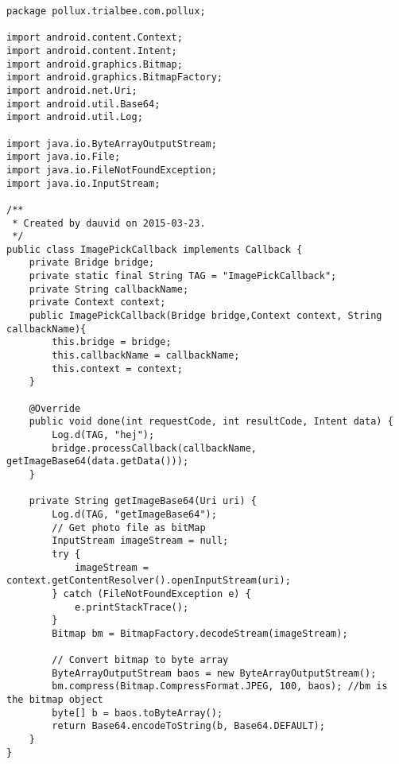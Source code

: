 \begin{lstlisting}
package pollux.trialbee.com.pollux;

import android.content.Context;
import android.content.Intent;
import android.graphics.Bitmap;
import android.graphics.BitmapFactory;
import android.net.Uri;
import android.util.Base64;
import android.util.Log;

import java.io.ByteArrayOutputStream;
import java.io.File;
import java.io.FileNotFoundException;
import java.io.InputStream;

/**
 * Created by dauvid on 2015-03-23.
 */
public class ImagePickCallback implements Callback {
    private Bridge bridge;
    private static final String TAG = "ImagePickCallback";
    private String callbackName;
    private Context context;
    public ImagePickCallback(Bridge bridge,Context context, String callbackName){
        this.bridge = bridge;
        this.callbackName = callbackName;
        this.context = context;
    }

    @Override
    public void done(int requestCode, int resultCode, Intent data) {
        Log.d(TAG, "hej");
        bridge.processCallback(callbackName, getImageBase64(data.getData()));
    }

    private String getImageBase64(Uri uri) {
        Log.d(TAG, "getImageBase64");
        // Get photo file as bitMap
        InputStream imageStream = null;
        try {
            imageStream = context.getContentResolver().openInputStream(uri);
        } catch (FileNotFoundException e) {
            e.printStackTrace();
        }
        Bitmap bm = BitmapFactory.decodeStream(imageStream);

        // Convert bitmap to byte array
        ByteArrayOutputStream baos = new ByteArrayOutputStream();
        bm.compress(Bitmap.CompressFormat.JPEG, 100, baos); //bm is the bitmap object
        byte[] b = baos.toByteArray();
        return Base64.encodeToString(b, Base64.DEFAULT);
    }
}
\end{lstlisting}

